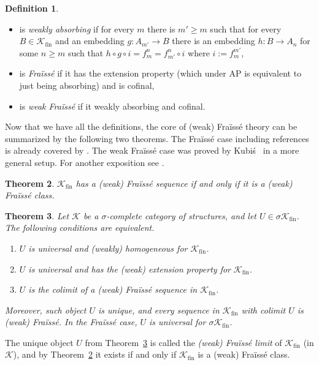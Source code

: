 \documentclass[10pt,a4paper]{article}
\newtheorem{tw}{Theorem}[section]
\theoremstyle{definition}
\newtheorem{df}[tw]{Definition}
\theoremstyle{remark}
\newcommand \maps {\colon} %
\newcommand \cmp {\circ} %
\newcommand \sig {\sigma}
\newcommand \K {\mathscr{K}}
\newcommand \fin {{\operatorname{fin}}}
\begin{document}
\begin{df}
\begin{itemize}
    \item is \emph{weakly absorbing} if for every $m$ there is $m' \geq m$ such that for every $B \in \K_\fin$ and an embedding $g\maps A_{m'} \to B$ there is an embedding $h\maps B \to A_n$ for some $n \geq m$ such that  $h \cmp g \cmp i = f^n_m = f^n_{m'} \cmp i$ where $i := f^{m'}_m$,
    
    \item is \emph{Fraïssé} if it has the extension property (which under AP is equivalent to just being absorbing) and is cofinal,

    \item is \emph{weak Fraïssé} if it weakly absorbing and cofinal.
\end{itemize}
\end{df}

Now that we have all the definitions, the core of (weak) Fraïssé theory can be summarized by the following two theorems.
The Fraïssé case including references is already covered by \cite[Theorems~3.2 and 3.3]{paper1}.
The weak Fraïssé case was proved by Kubiś~\cite[Theorems~3.7, 4.2 and 5.1]{KubWeakFraisse} in a more general setup.
For another exposition see \cite[Section~2.2]{BBDK}.

\begin{tw} \label{thm:Fclass}
    $\K_\fin$ has a (weak) Fraïssé sequence if and only if it is a (weak) Fraïssé class.
\end{tw}

\begin{tw} \label{thm:Flim}
    Let $\K$ be a $\sigma$-complete category of structures, and let $U \in \sig\K_\fin$.
    The following conditions are equivalent.
    \begin{enumerate}
        \item $U$ is universal and (weakly) homogeneous for $\K_\fin$.
        \item $U$ is universal and has the (weak) extension property for $\K_\fin$.
        \item $U$ is the colimit of a (weak) Fraïssé sequence in $\K_\fin$.
    \end{enumerate}
    Moreover, such object $U$ is unique, and every sequence in $\K_\fin$ with colimit $U$ is (weak) Fraïssé.
    In the Fraïssé case, $U$ is universal for $\sig\K_\fin$.
\end{tw}

The unique object $U$ from Theorem~\ref{thm:Flim} is called the \emph{(weak) Fraïssé limit} of $\K_\fin$ (in $\K$), and by Theorem~\ref{thm:Fclass} it exists if and only if $\K_\fin$ is a (weak) Fraïssé class.
\end{document}
